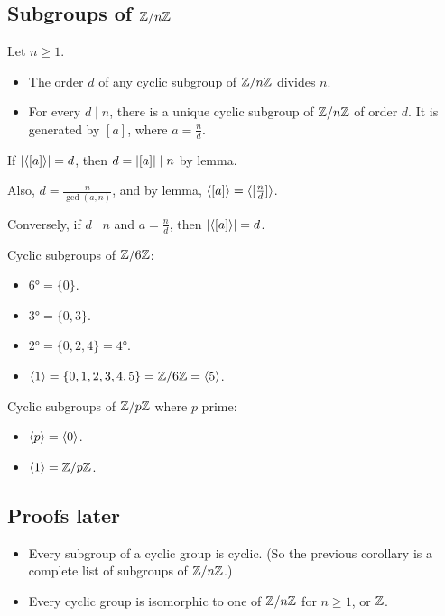 \documentclass[12pt,letterpaper]{report}
\begin{document}
\pagebreak
\subsection[Subgroups of Z mod nZ]{Subgroups of $\mathbb{Z}/{n}\mathbb{Z}$}

\begin{cor}{}{}
  Let $n \geq 1$.
  \begin{itemize}
    \item The order $d$ of any cyclic subgroup of $\mathbb{Z}/{n}\mathbb{Z}$ divides $n$.
    \item For every $d \mid n$, there is a unique cyclic subgroup of $\mathbb{Z}/{n}\mathbb{Z}$ of order $d$.
    It is generated by $[a]$, where $a = \frac{n}{d}$.
  \end{itemize}
\end{cor}

\begin{thmproof}
  If $\lvert\langle[a]\rangle\rvert = d$, then $d = \lvert[a]\rvert \mid n$ by lemma.

  Also, $d = \frac{n}{\gcd(a, n)}$, and by lemma, $\langle[a]\rangle = \langle[\frac{n}{d}]\rangle$.

  Conversely, if $d \mid n$ and $a = \frac{n}{d}$, then $\lvert\langle[a]\rangle\rvert = d$.
\end{thmproof}

\begin{ex}
  Cyclic subgroups of $\mathbb{Z}/{6}\mathbb{Z}$:
  \begin{itemize}
    \item $\ang{6} = \{0\}$.
    \item $\ang{3} = \{0, 3\}$.
    \item $\ang{2} = \{0, 2, 4\} = \ang{4}$.
    \item $\langle1\rangle = \{0, 1, 2, 3, 4, 5\} = \mathbb{Z}/{6}\mathbb{Z} = \langle5\rangle$.
  \end{itemize}

  Cyclic subgroups of $\mathbb{Z}/{p}\mathbb{Z}$ where $p$ prime:
  \begin{itemize}
    \item $\langle p\rangle = \langle0\rangle$.
    \item $\langle1\rangle = \mathbb{Z}/{p}\mathbb{Z}$.
  \end{itemize}
\end{ex}

\pagebreak
\subsection{Proofs later}

\begin{itemize}
  \item Every subgroup of a cyclic group is cyclic.
  (So the previous corollary is a complete list of subgroups of $\mathbb{Z}/{n}\mathbb{Z}$.)
  \item Every cyclic group is isomorphic to one of $\mathbb{Z}/{n}\mathbb{Z}$ for $n \geq 1$, or $\mathbb{Z}$.
\end{itemize}
\end{document}
